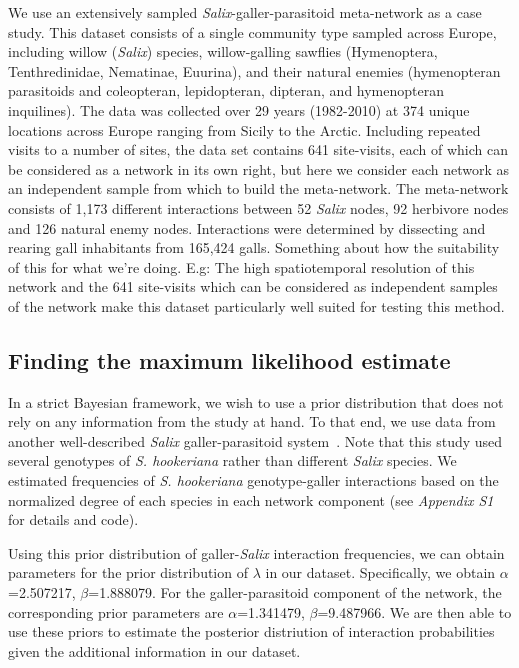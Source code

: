 \documentclass[12pt]{article}
\begin{document}
      We use an extensively sampled \emph{Salix}-galler-parasitoid meta-network as a case study. This dataset consists of a single community type sampled across Europe, including willow (\emph{Salix}) species, willow-galling sawflies (Hymenoptera, Tenthredinidae, Nematinae, Euurina), and their natural enemies (hymenopteran parasitoids and coleopteran, lepidopteran, dipteran, and hymenopteran inquilines). The data was collected over 29 years (1982-2010) at 374 unique locations across Europe ranging from Sicily to the Arctic. Including repeated visits to a number of sites, the data set contains 641 site-visits, each of which can be considered as a network in its own right, but here we consider each network as an independent sample from which to build the meta-network. The meta-network consists of 1,173 different interactions between 52 \emph{Salix} nodes, 92 herbivore nodes and 126 natural enemy nodes. Interactions were determined by dissecting and rearing gall inhabitants from 165,424 galls. Something about how the suitability of this for what we're doing. E.g: The high spatiotemporal resolution of this network and the 641 site-visits which can be considered as independent samples of the network make this dataset particularly well suited for testing this method.


    \subsection*{Finding the maximum likelihood estimate}

      In a strict Bayesian framework, we wish to use a prior distribution that does not rely on any information from the study at hand. To that end, we use data from another well-described \emph{Salix} galler-parasitoid system~\citep{Barbour2016,Barbour2016Dryad}. Note that this study used several genotypes of \emph{S. hookeriana} rather than different \emph{Salix} species. We estimated frequencies of  \emph{S. hookeriana} genotype-galler interactions based on the normalized degree of each species in each network component (see \emph{Appendix S1} for details and code).


      Using this prior distribution of galler-\emph{Salix} interaction frequencies, we can obtain parameters for the prior distribution of $\lambda$ in our dataset. Specifically, we obtain $\alpha$=2.507217, $\beta$=1.888079. For the galler-parasitoid component of the network, the corresponding prior parameters are $\alpha$=1.341479, $\beta$=9.487966.
      We are then able to use these priors to estimate the posterior distriution of interaction probabilities given the additional information in our dataset.
\end{document}
